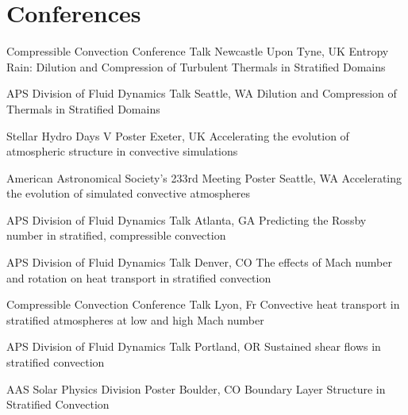 \section{Conferences}

		{Compressible Convection Conference}
		{Talk}
		{Newcastle Upon Tyne, UK}
		{}
		{Entropy Rain: Dilution and Compression of Turbulent Thermals in Stratified Domains}

\cventry{}
		{APS Division of Fluid Dynamics}
		{Talk}
		{Seattle, WA}
		{}
		{Dilution and Compression of Thermals in Stratified Domains}

\cventry{}
		{Stellar Hydro Days V}
		{Poster}
		{Exeter, UK}
		{}
		{Accelerating the evolution of atmospheric structure in convective simulations}

\cventry{}
		{American Astronomical Society's 233rd Meeting}
		{Poster}
		{Seattle, WA}
		{}
		{Accelerating the evolution of simulated convective atmospheres}

		{APS Division of Fluid Dynamics}
		{Talk}
		{Atlanta, GA}
		{}
		{Predicting the Rossby number in stratified, compressible convection}

		{APS Division of Fluid Dynamics}
		{Talk}
		{Denver, CO}
		{}
		{The effects of Mach number and rotation on heat transport in stratified convection}

\cventry{}
		{Compressible Convection Conference}
		{Talk}
		{Lyon, Fr}
		{}
		{Convective heat transport in stratified atmospheres at low and high Mach number}

		{APS Division of Fluid Dynamics}
		{Talk}
		{Portland, OR}
		{}
		{Sustained shear flows in stratified convection}

\cventry{}
		{AAS Solar Physics Division}
		{Poster}
		{Boulder, CO}
		{}
		{Boundary Layer Structure in Stratified Convection}

